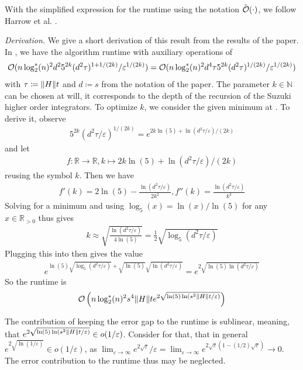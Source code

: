 With the simplified expression for the runtime using the notation \(\tilde{\operatorname{\mathcal{O}}}(\cdot)\), we follow Harrow et al. \cite[pp. 5-6]{Harrow2008}.

\emph{Derivation.} We give a short derivation of this result from the results of the paper. In \cite[pp. 8-9]{Berry2005}, we have the algorithm runtime with auxiliary operations of
\begin{align}
    \operatorname{\mathcal{O}}(n\log_2^*(n)^2d^25^{2k}(d^2\tau)^{1 + 1/(2k)}/\varepsilon^{1/(2k)}) = \operatorname{\mathcal{O}}(n\log_2^*(n)^2d^4\tau5^{2k}(d^2\tau)^{1/(2k)}/\varepsilon^{1/(2k)})
\end{align}
with \(\tau \coloneqq \norm{H}t\) and \(d \coloneqq s\) from the notation of the paper. The parameter \(k \in \mathbb{N}\) can be chosen at will, it corresponds to the depth of the recursion of the Suzuki higher order integrators. To optimize \(k\), we consider the given minimum at \cite[pp. 1-2]{Berry2005}. To derive it, observe
\begin{align}
    5^{2k}(d^2\tau/\varepsilon)^{1/(2k)} = e^{2k\ln(5)+\ln(d^2\tau/\varepsilon)/(2k)} \label{hamsim_small_exponential_rewrite}
\end{align}
and let
\begin{align}
    f\colon \mathbb{R} \to \mathbb{R}, k \mapsto 2k\ln(5)+\ln(d^2\tau/\varepsilon)/(2k)
\end{align}
reusing the symbol \(k\). Then we have
\begin{align}
    f'(k) = 2\ln(5) - \frac{\ln(d^2\tau/\varepsilon)}{2k^2}, f''(k) = \frac{\ln(d^2\tau/\varepsilon)}{k^3}
\end{align}
Solving for a minimum and using \(\log_5(x) = \ln(x)/\ln(5)\) for any \(x \in \mathbb{R}_{> 0}\) thus gives
\begin{align}
    k \approx \sqrt{\frac{\ln(d^2\tau/\varepsilon)}{4\ln(5)}} = \frac{1}{2}\sqrt{\log_5(d^2\tau/\varepsilon)}
\end{align}
Plugging this into  then gives the value
\begin{align}
    e^{\ln(5)\sqrt{\log_5(d^2\tau/\varepsilon)} + \sqrt{\ln(5)}\sqrt{\ln(d^2\tau/\varepsilon)}} = e^{2\sqrt{\ln(5)\ln(d^2\tau/\varepsilon)}}
\end{align}
So the runtime is
\begin{align}
    \operatorname{\mathcal{O}}\left(n\log_2^*(n)^2s^4\norm{H}te^{2\sqrt{\ln(5)\ln(s^2\norm{H}t/\varepsilon)}}\right)
\end{align}

\begin{remark}
    The contribution of keeping the error gap to the runtime is sublinear, meaning, that \(e^{2\sqrt{\ln(5)\ln(s^2\norm{H}t/\varepsilon)}} \in o(1/\varepsilon)\). Consider for that, that in general \(e^{2\sqrt{\ln(1/\varepsilon)}} \in o(1/\varepsilon)\), as \(\lim_{\varepsilon \to \infty} e^{2\sqrt{\varepsilon}}/\varepsilon = \lim_{\varepsilon \to \infty} e^{2\sqrt{\varepsilon}(1 - (1/2)\sqrt{\varepsilon})} \to 0\). The error contribution to the runtime thus may be neglected.
\end{remark}

